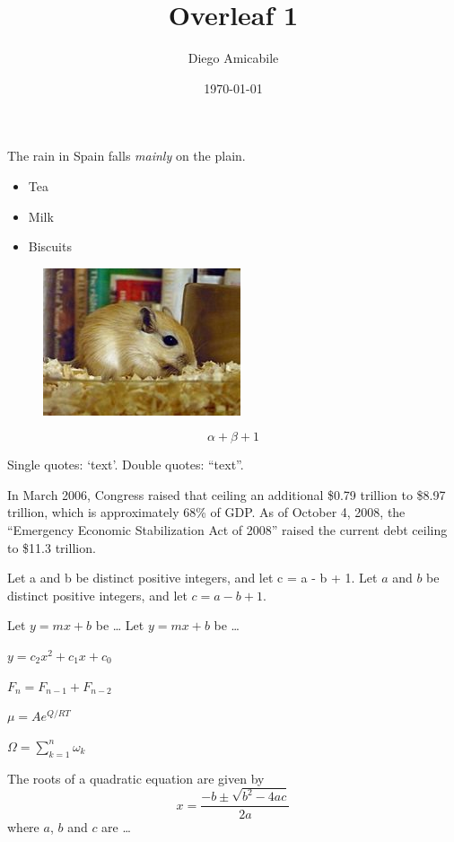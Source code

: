 \documentclass[a4paper,12pt]{article}
\begin{document}
\title{Overleaf 1}
\author{Diego Amicabile}
\date{\today}
\maketitle

The rain in Spain falls \emph{mainly} on the plain.


\begin{itemize}
\item Tea
\item Milk
\item Biscuits
\end{itemize}


\begin{figure}
\includegraphics{gerbil}
\end{figure}

\begin{equation}
\alpha + \beta + 1
\end{equation}


Single quotes: `text'.
Double quotes: ``text''.


In March 2006, Congress raised that ceiling an additional \$0.79
trillion to \$8.97 trillion, which is approximately 68\% of GDP. As of
October 4, 2008, the ``Emergency Economic Stabilization Act of
2008'' raised the current debt ceiling to \$11.3 trillion.

Let a and b be distinct positive
integers, and let c = a - b + 1.
Let $a$ and $b$ be distinct positive
integers, and let $c = a - b + 1$.

Let $y=mx+b$ be \ldots
Let $y = m x + b$ be \ldots


$y = c_2 x^2 + c_1 x + c_0$


$F_n = F_{n-1} + F_{n-2}$

$\mu = A e^{Q/RT}$



$\Omega = \sum_{k=1}^{n} \omega_k$


The roots of a quadratic equation
are given by
\begin{equation}
x = \frac{-b \pm \sqrt{b^2 - 4ac}}
{2a}
\end{equation}
where $a$, $b$ and $c$ are \ldots
\end{document}
